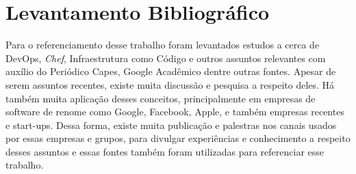 \section{Levantamento Bibliográfico}

Para o referenciamento desse trabalho foram levantados estudos a cerca de
DevOps, \textit{Chef}, Infraestrutura como Código e outros assuntos relevantes com
auxílio do Periódico Capes, Google Acadêmico dentre outras fontes.
Apesar de serem assuntos recentes, existe muita discussão e pesquisa a
respeito deles. Há também muita aplicação desses conceitos, principalmente
em empresas de software de renome como Google, Facebook, Apple, e também
empresas recentes e start-ups. Dessa forma, existe muita publicação e
palestras nos canais usados por essas empresas e grupos, para divulgar
experiências e conhecimento a respeito desses assuntos e essas fontes
também foram utilizadas para referenciar esse trabalho. 

